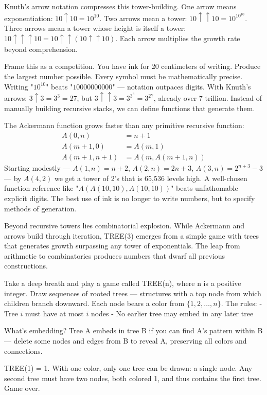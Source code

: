 Knuth's arrow notation compresses this tower-building. One arrow means exponentiation: $10 \uparrow 10 = 10^{10}$. Two arrows mean a tower: $10 \uparrow\uparrow 10 = 10^{10^{10}}$. Three arrows mean a tower whose height is itself a tower: $10 \uparrow\uparrow\uparrow 10 = 10 \uparrow\uparrow (10 \uparrow\uparrow 10)$. Each arrow multiplies the growth rate beyond comprehension.

Frame this as a competition. You have ink for 20 centimeters of writing. Produce the largest number possible. Every symbol must be mathematically precise. Writing "$10^{10}$" beats "$10000000000$" — notation outpaces digits. With Knuth's arrows: $3 \uparrow 3 = 3^3 = 27$, but $3 \uparrow\uparrow 3 = 3^{3^3} = 3^{27}$, already over 7 trillion. Instead of manually building recursive stacks, we can define functions that generate them.

The Ackermann function grows faster than any primitive recursive function:
\[
\begin{aligned}
A(0,n) &= n+1 \\
A(m+1,0) &= A(m,1) \\
A(m+1,n+1) &= A(m, A(m+1,n))
\end{aligned}
\]
Starting modestly — $A(1,n) = n+2$, $A(2,n) = 2n+3$, $A(3,n) = 2^{n+3} - 3$ — by $A(4,2)$ we get a tower of 2's that is 65,536 levels high. A well-chosen function reference like "$A(A(10,10),A(10,10))$" beats unfathomable explicit digits. The best use of ink is no longer to write numbers, but to specify methods of generation.

Beyond recursive towers lies combinatorial explosion. While Ackermann and arrows build through iteration, TREE(3) emerges from a simple game with trees that generates growth surpassing any tower of exponentials. The leap from arithmetic to combinatorics produces numbers that dwarf all previous constructions.

Take a deep breath and play a game called TREE(n), where n is a positive integer. Draw sequences of rooted trees — structures with a top node from which children branch downward. Each node bears a color from $\{1, 2, \ldots, n\}$. The rules:
- Tree $i$ must have at most $i$ nodes
- No earlier tree may embed in any later tree

What's embedding? Tree A embeds in tree B if you can find A's pattern within B — delete some nodes and edges from B to reveal A, preserving all colors and connections.

TREE(1) = 1. With one color, only one tree can be drawn: a single node. Any second tree must have two nodes, both colored 1, and thus contains the first tree. Game over.

